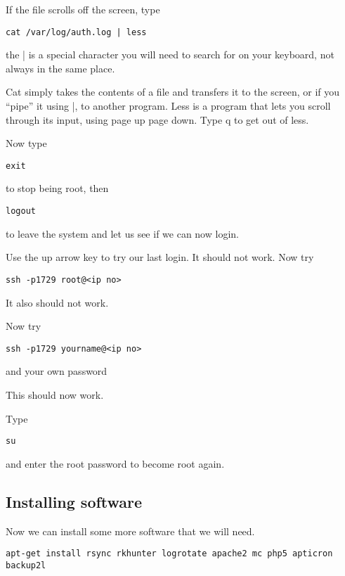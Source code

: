 \documentclass[12pt, a4paper]{article}
\begin{document}
If the file scrolls off the screen, type
\begin{verbatim}
cat /var/log/auth.log | less
\end{verbatim}
the | is a special character you will need to search for on your keyboard, not always in the same place.

Cat simply takes the contents of a file and transfers it to the screen, or if you “pipe” it using |, to another program. Less is a program that lets you scroll through its input, using page up page down. Type q to get out of less.  

Now type
\begin{verbatim}
exit
\end{verbatim}
to stop being root, then
\begin{verbatim}
logout
\end{verbatim}
to leave the system
and let us see if we can now login.

Use the up arrow key to try our last login. It should not work.
Now try

\begin{verbatim}
ssh -p1729 root@<ip no>
\end{verbatim}

It also should not work.

Now try
\begin{verbatim}
ssh -p1729 yourname@<ip no>
\end{verbatim}

and your own password

This should now work.

Type 

\begin{verbatim}
su
\end{verbatim}

and enter the root password to become root again.

\subsection*{Installing software}
Now we can install some more software that we will need.
\begin{verbatim}
apt-get install rsync rkhunter logrotate apache2 mc php5 apticron backup2l
\end{verbatim}
\end{document}

